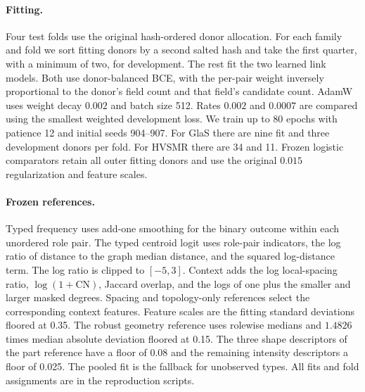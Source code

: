 \documentclass[10pt,twocolumn,letterpaper]{article}
\begin{document}
\paragraph{Fitting.}
Four test folds use the original hash-ordered donor allocation. For each family and fold we sort fitting donors by a second salted hash and take the first quarter, with a minimum of two, for development. The rest fit the two learned link models. Both use donor-balanced BCE, with the per-pair weight inversely proportional to the donor's field count and that field's candidate count. AdamW uses weight decay $0.002$ and batch size 512. Rates $0.002$ and $0.0007$ are compared using the smallest weighted development loss. We train up to 80 epochs with patience 12 and initial seeds 904--907. For GlaS there are nine fit and three development donors per fold. For HVSMR there are 34 and 11. Frozen logistic comparators retain all outer fitting donors and use the original $0.015$ regularization and feature scales.

\paragraph{Frozen references.}
Typed frequency uses add-one smoothing for the binary outcome within each unordered role pair. The typed centroid logit uses role-pair indicators, the log ratio of distance to the graph median distance, and the squared log-distance term. The log ratio is clipped to $[-5,3]$. Context adds the log local-spacing ratio, $\log(1+\mathrm{CN})$, Jaccard overlap, and the logs of one plus the smaller and larger masked degrees. Spacing and topology-only references select the corresponding context features. Feature scales are the fitting standard deviations floored at 0.35. The robust geometry reference uses rolewise medians and $1.4826$ times median absolute deviation floored at 0.15. The three shape descriptors of the part reference have a floor of 0.08 and the remaining intensity descriptors a floor of 0.025. The pooled fit is the fallback for unobserved types. All fits and fold assignments are in the reproduction scripts.
\end{document}

